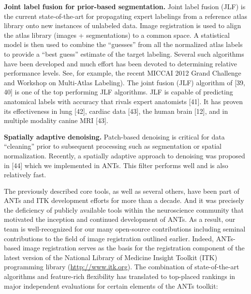\documentclass[11pt,]{article}
\begin{document}
\textbf{Joint label fusion for prior-based segmentation.} Joint label
fusion (JLF) is the current state-of-the-art for propagating expert
labelings from a reference atlas library onto new instances of unlabeled
data. Image registration is used to align the atlas library (images +
segmentations) to a common space. A statistical model is then used to
combine the ``guesses'' from all the normalized atlas labels to provide
a ``best guess'' estimate of the target labeling. Several such
algorithms have been developed and much effort has been devoted to
determining relative performance levels. See, for example, the recent
MICCAI 2012 Grand Challenge and Workshop on Multi-Atlas Labeling). The
joint fusion (JLF) algorithm of {[}39, 40{]} is one of the top
performing JLF algorithms. JLF is capable of predicting anatomical
labels with accuracy that rivals expert anatomists {[}41{]}. It has
proven its effectiveness in lung {[}42{]}, cardiac data {[}43{]}, the
human brain {[}12{]}, and in multiple modality canine MRI {[}43{]}.

\textbf{Spatially adaptive denoising.} Patch-based denoising is critical
for data ``cleaning'' prior to subsequent processing such as
segmentation or spatial normalization. Recently, a spatially adaptive
approach to denoising was proposed in {[}44{]} which we implemented in
ANTs. This filter performs well and is also relatively fast.

The previously described core tools, as well as several others, have
been part of ANTs and ITK development efforts for more than a decade.
And it was precisely the deficiency of publicly available tools within
the neuroscience community that motivated the inception and continued
development of ANTs. As a result, our team is well-recognized for our
many open-source contributions including seminal contributions to the
field of image registration outlined earlier. Indeed, ANTs-based image
registration serves as the basis for the registration component of the
latest version of the National Library of Medicine Insight Toolkit (ITK)
programming library (\url{http://www.itk.org}). The combination of
state-of-the-art algorithms and feature-rich flexibility has translated
to top-placed rankings in major independent evaluations for certain
elements of the ANTs toolkit:
\end{document}
